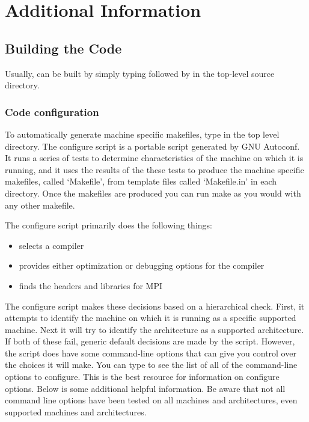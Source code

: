 \chapter{Additional Information}


\section{Building the Code}

Usually, \hypre{} can be built by simply typing 
followed by  in the top-level source directory.

\subsection{Code configuration}

To automatically generate machine specific makefiles, type
 in the top level directory.  The configure
script is a portable script generated by GNU Autoconf.  It runs a
series of tests to determine characteristics of the machine on which
it is running, and it uses the results of the these tests to produce
the machine specific makefiles, called `Makefile', from template files
called `Makefile.in' in each directory.  Once the makefiles are
produced you can run make as you would with any other makefile.

The configure script primarily does the following things:
\begin{itemize}
\item selects a compiler
\item provides either optimization or debugging options for the compiler
\item finds the headers and libraries for MPI
\end{itemize}

The configure script makes these decisions based on a hierarchical
check.  First, it attempts to identify the machine on which it is
running as a specific supported machine.  Next it will try to identify
the architecture as a supported architecture.  If both of these fail,
generic default decisions are made by the script.  However, the script
does have some command-line options that can give you control over the
choices it will make.  You can type  to see the
list of all of the command-line options to configure. This is the best
resource for information on configure options.  Below is some
additional helpful information.  Be aware that not all command line
options have been tested on all machines and architectures, even
supported machines and architectures.


